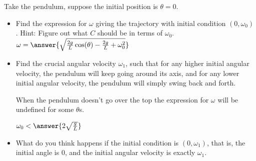 \documentclass{ximera}
\begin{document}
\begin{exercise}%
    Take the pendulum, suppose the initial position is $\theta = 0$.
    \begin{itemize}
        \item Find the expression for $\omega$ giving the trajectory with initial condition $(0,\omega_0)$.  Hint: Figure out what $C$ should be in terms of $\omega_0$.\\
            $\omega = \answer{\sqrt{\frac{2g}{L}\cos(\theta) - \frac{2g}{L} + \omega_0^2}}$
        \item Find the crucial angular velocity $\omega_1$, such that for any higher initial angular velocity, the pendulum will keep going around its axis, and for any lower initial angular velocity, the pendulum will simply swing back and forth.    
            \begin{hint}
                When the pendulum doesn't go over the top the expression for $\omega$ will be undefined for some $\theta$s.
            \end{hint}
            $\omega_0 < \answer{2\sqrt{\frac{g}{L}}}$
        \item What do you think happens if the initial condition is $(0,\omega_1)$, that is, the initial angle is 0, and the initial angular velocity is exactly $\omega_1$.
    \end{itemize}
\end{exercise}



\end{document}
